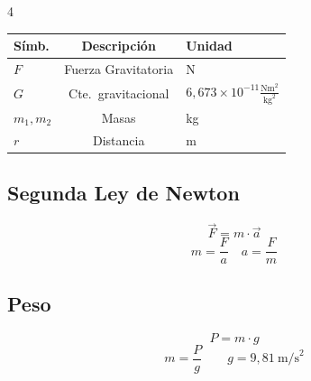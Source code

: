 \documentclass[9pt, landscape, letterpaper]{extarticle}
\begin{document}
\begin{multicols}{4}
  \begin{tablabox}[Variables]
    \tablacompacta
    \begin{tabular}{@{}lcl@{}}
      \toprule
      Símb.      & Descripción         & Unidad                                                    \\
      \midrule
      $F$        & Fuerza Gravitatoria & N                                                         \\
      $G$        & Cte.\ gravitacional & $6{,}673 \times 10^{-11} \frac{\text{Nm}^2}{\text{kg}^2}$ \\
      $m_1, m_2$ & Masas               & kg                                                        \\
      $r$        & Distancia           & m                                                         \\
      \bottomrule
    \end{tabular}
  \end{tablabox}

  \subsection{Segunda Ley de Newton}

  \begin{formulabox}
    $$\vec{F} = m \cdot \vec{a}$$
    $$m = \frac{F}{a} \quad a = \frac{F}{m}$$
  \end{formulabox}

  \subsection{Peso}

  \begin{formulabox}
    $$P = m \cdot g$$
    $$m = \frac{P}{g} \qquad g = 9{,}81\ \text{m/s}^2$$
  \end{formulabox}





\end{multicols}
\end{document}
